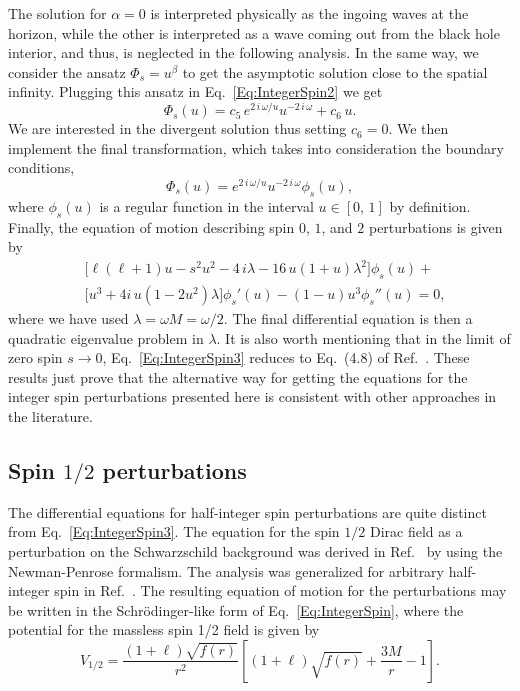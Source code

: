 %
The solution for $\alpha =0$ is interpreted physically as the ingoing waves at the horizon, while the other is interpreted as a wave coming out from the black hole interior, and thus, is neglected in the following analysis. In the same way, we consider the ansatz $\Phi_{s}=u^{\beta}$ to get the asymptotic solution close to the spatial infinity. Plugging this ansatz in Eq.~\eqref{Eq:IntegerSpin2} we get
%
\begin{equation}\label{Eq:AsymInfinite}
  \Phi_{s}(u)=c_5\,e^{2\,i\,\omega/u}u^{-2\,i\,\omega}+c_6\,u.
\end{equation}
%
We are interested in the divergent solution thus setting $c_6=0$. We then implement the final transformation, which takes into consideration the boundary conditions,
%
\begin{equation}\label{Eq:FinalTrans}
  \Phi_{s}(u)=e^{2\,i\,\omega/u}u^{-2\,i\,\omega}\phi_{s}(u),
\end{equation}
%
where $\phi_{s}(u)$ is a regular function in the interval $u\in[0,\,1]$ by definition. Finally, the equation of motion describing spin $0$, $1$, and $2$ perturbations is given by
%
\begin{equation}\label{Eq:IntegerSpin3}
  \begin{split}
    &\!\!\Big[\ell\left(\ell+1\right) u -s^2u^2-4\,i\lambda-16\,u\left(1+u\right)\lambda^2\Big]\phi_{s}(u)+\\
    & \!\!\Big[u^3+4i\,u\left(1-2u^2\right)\lambda\Big]\phi_{s}'(u)-(1-u)u^3\phi_{s}''(u)=0,
  \end{split}
\end{equation}
%
where we have used $\lambda=\omega M=\omega/2$. The final differential equation is then a quadratic eigenvalue problem in $\lambda$. It is also worth mentioning that in the limit of zero spin $s\to 0$, Eq.~\eqref{Eq:IntegerSpin3} reduces to Eq.~(4.8) of Ref.~\cite{qnmspectral}. These results just prove that the alternative way for getting the equations for the integer spin perturbations presented here is consistent with other approaches in the literature.

\subsection{Spin $1/2$ perturbations}

The differential equations for half-integer spin perturbations are quite distinct from Eq.~\eqref{Eq:IntegerSpin3}. The equation for the spin $1/2$ Dirac field as a perturbation on the Schwarzschild background was derived in Ref.~\cite{Cho:2003qe} by using the Newman-Penrose formalism. The analysis was generalized for arbitrary half-integer spin in Ref.~\cite{Shu:2005fw}. The resulting equation of motion for the perturbations may be written in the Schr\"odinger-like form of Eq.~\eqref{Eq:IntegerSpin}, where the potential for the massless spin 1/2 field is given by
%
\begin{equation}\label{eq:pot-s12}
  V_{\scriptscriptstyle{1/2}}= \frac{\left(1+\ell\right)\sqrt{f(r)}}{r^{2}} \left[\left(1+\ell\right)\sqrt{f(r)}+\frac{3M}{r}-1\right].
\end{equation}

